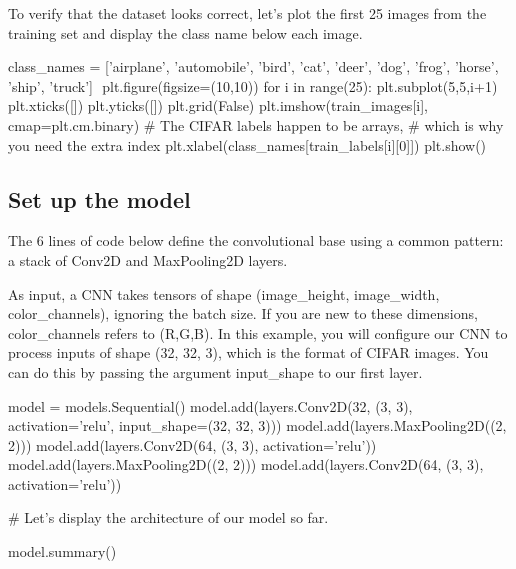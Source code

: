 \documentclass[%
oneside,                 %
final,                   %
10pt]{article}
\begin{document}
To verify that the dataset looks correct, let's plot the first 25 images from the training set and display the class name below each image.
















\bpycod
class_names = ['airplane', 'automobile', 'bird', 'cat', 'deer',
               'dog', 'frog', 'horse', 'ship', 'truck']
​
plt.figure(figsize=(10,10))
for i in range(25):
    plt.subplot(5,5,i+1)
    plt.xticks([])
    plt.yticks([])
    plt.grid(False)
    plt.imshow(train_images[i], cmap=plt.cm.binary)
    # The CIFAR labels happen to be arrays, 
    # which is why you need the extra index
    plt.xlabel(class_names[train_labels[i][0]])
plt.show()

\epycod


\subsection{Set up  the model}

The 6 lines of code below define the convolutional base using a common pattern: a stack of Conv2D and MaxPooling2D layers.

As input, a CNN takes tensors of shape (image_height, image_width, color_channels), ignoring the batch size. If you are new to these dimensions, color_channels refers to (R,G,B). In this example, you will configure our CNN to process inputs of shape (32, 32, 3), which is the format of CIFAR images. You can do this by passing the argument input_shape to our first layer.












\bpycod
model = models.Sequential()
model.add(layers.Conv2D(32, (3, 3), activation='relu', input_shape=(32, 32, 3)))
model.add(layers.MaxPooling2D((2, 2)))
model.add(layers.Conv2D(64, (3, 3), activation='relu'))
model.add(layers.MaxPooling2D((2, 2)))
model.add(layers.Conv2D(64, (3, 3), activation='relu'))

# Let's display the architecture of our model so far.

model.summary()

\epycod
\end{document}
